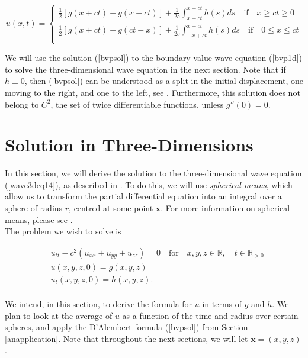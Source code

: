 \documentclass[a4paper, 12pt]{article}
\numberwithin{equation}{section}
\begin{document}
\begin{equation} \label{bvpsol}
    u(x,t)=
    \begin{cases}
        \frac{1}{2}\left[g(x+ct)+g(x-ct)\right]+\frac{1}{2c}\int^{x+ct}_{x-ct}h(s)ds \quad \textrm{if} \quad x \ge ct \ge 0\\
        \frac{1}{2}\left[g(x+ct)-g(ct-x)\right]+\frac{1}{2c}\int^{x+ct}_{-x+ct}h(s)ds \quad \textrm{if} \quad 0 \le x \le ct\\
    \end{cases}
\end{equation}

We will use the solution (\ref{bvpsol}) to the boundary value wave equation
(\ref{bvp1d}) to solve the three-dimensional wave equation in the next section.
Note that if $h \equiv 0$, then (\ref{bvpsol}) can be understood as a split in
the initial displacement, one moving to the right, and one to the left, see
\cite[Ch. 2.4.1]{Ev}. Furthermore, this solution does not belong to $C^2$, the set of twice
differentiable functions, unless $g''(0)=0$.

\section{Solution in Three-Dimensions} \label{sec3d}
In this section, we will derive the solution to the three-dimensional wave
equation (\ref{wave3deq14}), as described in \cite[Chap. 2.4]{Ev}. To do this,
we will use \emph{spherical means}, which allow us to transform the partial
differential equation into an integral over a sphere of radius $r$, centred at
some point $\boldsymbol{x}$. For more information on spherical means, please
see \cite{Sab}.
\\

The problem we wish to solve is

\begin{equation} \label{3deq}
\begin{aligned}
    &u_{tt}-c^2(u_{xx}+u_{yy}+u_{zz})=0 \quad \textrm {for} \quad x, y, z \in \mathbb{R}, \quad t \in \mathbb{R}_{>0}\\
    &u(x, y, z,0)=g(x,y,z)\\
    &u_t(x,y,z,0)=h(x,y,z).\\
\end{aligned}
\end{equation}

We intend, in this section, to derive the formula for $u$ in terms of $g$ and
$h$. We plan to look at the average of $u$ as a function of the time and radius
over certain spheres, and apply the D'Alembert formula (\ref{bvpsol}) from
Section \ref{anapplication}. Note that throughout the next sections, we will let
$\boldsymbol{x}=(x,y,z)$.
\end{document}
